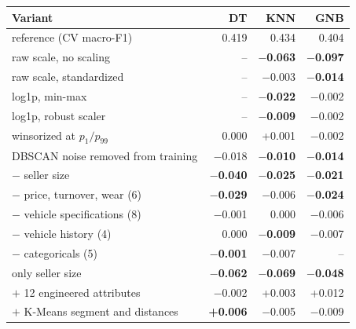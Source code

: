 \begin{tabular}{@{}lrrr@{}}
\toprule
Variant & DT & KNN & GNB \\
\midrule
reference (CV macro-F1) & 0.419 & 0.434 & 0.404 \\
\midrule
raw scale, no scaling & -- & \textbf{$-$0.063} & \textbf{$-$0.097} \\
raw scale, standardized & -- & $-$0.003 & \textbf{$-$0.014} \\
log1p, min-max & -- & \textbf{$-$0.022} & $-$0.002 \\
log1p, robust scaler & -- & \textbf{$-$0.009} & $-$0.002 \\
\midrule
winsorized at $p_1/p_{99}$ & 0.000 & +0.001 & $-$0.002 \\
DBSCAN noise removed from training & $-$0.018 & \textbf{$-$0.010} & \textbf{$-$0.014} \\
\midrule
$-$ seller size & \textbf{$-$0.040} & \textbf{$-$0.025} & \textbf{$-$0.021} \\
$-$ price, turnover, wear (6) & \textbf{$-$0.029} & $-$0.006 & \textbf{$-$0.024} \\
$-$ vehicle specifications (8) & $-$0.001 & 0.000 & $-$0.006 \\
$-$ vehicle history (4) & 0.000 & \textbf{$-$0.009} & $-$0.007 \\
$-$ categoricals (5) & \textbf{$-$0.001} & $-$0.007 & -- \\
only seller size & \textbf{$-$0.062} & \textbf{$-$0.069} & \textbf{$-$0.048} \\
\midrule
$+$ 12 engineered attributes & $-$0.002 & +0.003 & +0.012 \\
$+$ K-Means segment and distances & \textbf{+0.006} & $-$0.005 & $-$0.009 \\
\bottomrule
\end{tabular}
